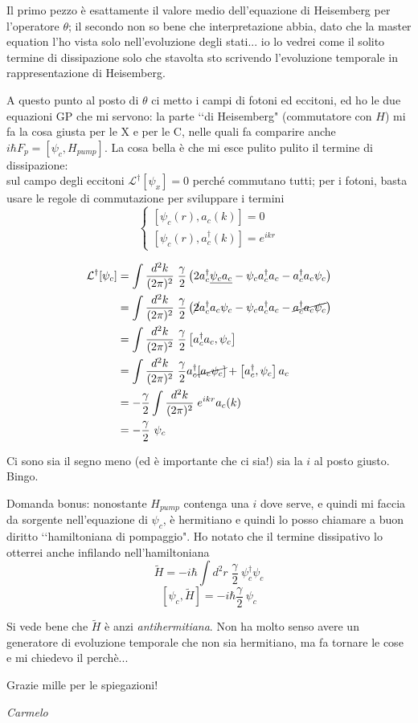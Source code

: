 \documentclass[mathserif]{article}
\newcommand{\daglind}[1]{\mathcal{L}^\dagger[#1]}
\newcommand{\intk}{\int\frac{d^2 k}{(2\pi)^2}\; }
\begin{document}
Il primo pezzo è esattamente il valore medio dell'equazione di Heisemberg per l'operatore $\theta$; il secondo non so bene che interpretazione abbia, dato che la master equation l'ho vista solo nell'evoluzione degli stati... io lo vedrei come il solito termine di dissipazione solo che stavolta sto scrivendo l'evoluzione temporale in rappresentazione di Heisemberg.

A questo punto al posto di $\theta$ ci metto i campi di fotoni ed eccitoni, ed ho le due equazioni GP che mi servono: la parte \lq\lq di Heisemberg" (commutatore con $H$) mi fa la cosa giusta per le X e per le C, nelle quali fa comparire anche $i\hbar F_p = [\psi_c,H_{pump}]$. La cosa bella è che mi esce pulito pulito il termine di dissipazione: \\
sul campo degli eccitoni $\daglind{\psi_x} = 0$ perché commutano tutti; per i fotoni, basta usare le regole di commutazione per sviluppare i termini
\begin{equation*}
\begin{cases}
\left[ \psi_c(r), a_c(k) \right] = 0 \\
\left[ \psi_c(r),a_c^\dagger(k)\right]= e^{ikr}
\end{cases}
\end{equation*}

\begin{align*}
\daglind{\psi_c} &= \intk \frac{\gamma}{2} \left ( 2a_c^\dagger \underline{\psi_c a_c} - \psi_c a_c^\dagger a_c - a_c^\dagger a_c \psi_c  \right )\\
    &= \intk \frac{\gamma}{2} \left ( \cancel{2}a_c^\dagger a_c \psi_c - \psi_c a_c^\dagger a_c - \cancel{a_c^\dagger a_c \psi_c}  \right )\\
    &= \intk \frac{\gamma}{2} \left [ a_c^\dagger a_c , \psi_c \right ]\\
    &=\intk \frac{\gamma}{2} a_c^\dagger \cancel{ \left [a_c \psi_c \right ]} + \left [ a_c^\dagger, \psi_c \right] a_c\\
    &= - \frac{\gamma}{2} \intk e^{ikr} a_c(k) \\
    &= - \frac{\gamma}{2}\ \psi_c
\end{align*}

Ci sono sia il segno meno (ed è importante che ci sia!) sia la $i$ al posto giusto. Bingo.

Domanda bonus: nonostante $H_{pump}$ contenga una $i$ dove serve, e quindi mi faccia da sorgente nell'equazione di $\psi_c$, è hermitiano e quindi lo posso chiamare a buon diritto \lq \lq hamiltoniana di pompaggio". Ho notato che il termine dissipativo lo otterrei anche infilando nell'hamiltoniana
\begin{equation*}
\tilde H = -i\hbar \int d^2r \; \frac{\gamma}{2}\ \psi_c^\dagger \psi_c
\end{equation*}
\begin{equation*}
\left[ \psi_c, \tilde H \right ] = -i\hbar\frac{\gamma}{2}\ \psi_c
\end{equation*}

Si vede bene che $\tilde H$ è anzi \emph{antihermitiana}. Non ha molto senso avere un generatore di evoluzione temporale che non sia hermitiano, ma fa tornare le cose e mi chiedevo il perchè...


Grazie mille per le spiegazioni!

\textit{Carmelo}
\end{document}
